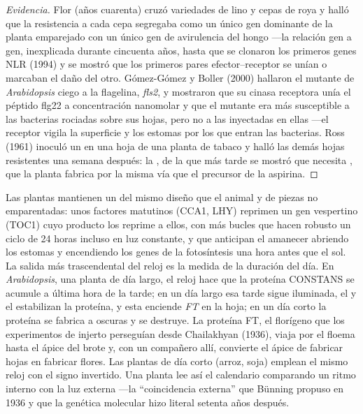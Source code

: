 \begin{proof}[Evidencia]
Flor (años cuarenta) cruzó variedades de lino y cepas de roya y halló
que la resistencia a cada cepa segregaba como un único gen dominante de
la planta emparejado con un único gen de avirulencia del hongo ---la
relación gen a gen, inexplicada durante cincuenta años, hasta que se
clonaron los primeros genes NLR (1994) y se mostró que los primeros
pares efector--receptor se unían o marcaban el daño del otro.
Gómez-Gómez y Boller (2000) hallaron el mutante de \emph{Arabidopsis}
ciego a la flagelina, \emph{fls2}, y mostraron que su cinasa receptora
unía el péptido flg22 a concentración nanomolar y que el mutante era
más susceptible a las bacterias rociadas sobre sus hojas, pero no a las
inyectadas en ellas ---el receptor vigila la superficie y los estomas
por los que entran las bacterias. Ross (1961) inoculó un  en una
hoja de una planta de tabaco y halló las demás hojas resistentes una
semana después: la , de la que más tarde
se mostró que necesita , que la planta fabrica por la
misma vía que el precursor de la aspirina.
\end{proof}

\begin{example}\label{ex:b3:plant-molecular-physiology:clock}
Las plantas mantienen un  del mismo diseño que el
animal y de piezas no emparentadas: unos factores matutinos (CCA1, LHY)
reprimen un gen vespertino (TOC1) cuyo producto los reprime a ellos,
con más bucles que hacen robusto un ciclo de 24 horas incluso en luz
constante, y que anticipan el amanecer abriendo los estomas y
encendiendo los genes de la fotosíntesis una hora antes que el sol. La
salida más trascendental del reloj es la medida de la duración del día.
En \emph{Arabidopsis}, una planta de día largo, el reloj hace que la
proteína CONSTANS se acumule a última hora de la tarde; en un día largo
esa tarde sigue iluminada, el  y el  estabilizan la
proteína, y esta enciende \emph{FT} en la hoja; en un día corto la
proteína se fabrica a oscuras y se destruye. La proteína FT, el
florígeno que los experimentos de injerto perseguían desde Chailakhyan
(1936), viaja por el floema hasta el ápice del brote y, con un
compañero allí, convierte el ápice de fabricar hojas en fabricar
flores. Las plantas de día corto (arroz, soja) emplean el mismo reloj
con el signo invertido. Una planta lee así el calendario comparando un
ritmo interno con la luz externa ---la ``coincidencia externa'' que
Bünning propuso en 1936 y que la genética molecular hizo literal
setenta años después.
\end{example}

